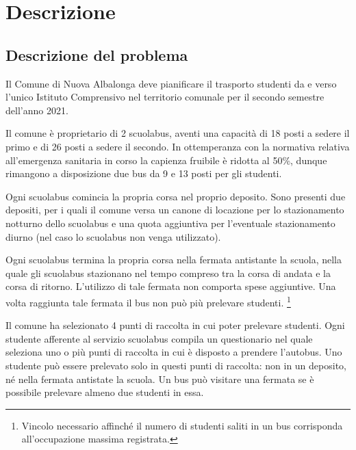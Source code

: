 
\chapter{Descrizione}  %
\label{cha:descrizione}
\ifpdf
    \graphicspath{{Chapter2/Figs/Raster/}{Chapter2/Figs/PDF/}{Chapter2/Figs/}}
\else
    \graphicspath{{Chapter2/Figs/Vector/}{Chapter2/Figs/}}
\fi
\section{Descrizione del problema}
Il Comune di Nuova Albalonga deve pianificare il trasporto studenti da e verso l'unico Istituto Comprensivo nel territorio comunale per il secondo semestre dell'anno 2021.

Il comune è proprietario di 2 scuolabus, aventi una capacità di 18 posti a sedere il primo e di 26 posti a sedere il secondo. In ottemperanza con la normativa relativa all'emergenza sanitaria in corso la capienza fruibile è ridotta al 50\%, dunque rimangono a disposizione due bus da 9 e 13 posti per gli studenti.

Ogni scuolabus comincia la propria corsa nel proprio deposito. Sono presenti due depositi, per i quali il comune versa un canone di locazione per lo stazionamento notturno dello scuolabus e una quota aggiuntiva per l'eventuale stazionamento diurno (nel caso lo scuolabus non venga utilizzato).

Ogni scuolabus termina la propria corsa nella fermata antistante la scuola, nella quale gli scuolabus stazionano nel tempo compreso tra la corsa di andata e la corsa di ritorno. L'utilizzo di tale fermata non comporta spese aggiuntive. Una volta raggiunta tale fermata il bus non può più prelevare studenti. \footnote{Vincolo necessario affinché il numero di studenti saliti in un bus corrisponda all'occupazione massima registrata.}

Il comune ha selezionato 4 punti di raccolta in cui poter prelevare studenti. Ogni studente afferente al servizio scuolabus compila un questionario nel quale seleziona uno o più punti di raccolta in cui è disposto a prendere l'autobus. Uno studente può essere prelevato solo in questi punti di raccolta: non in un deposito, né nella fermata antistate la scuola. Un bus può visitare una fermata se è possibile prelevare almeno due studenti in essa.

